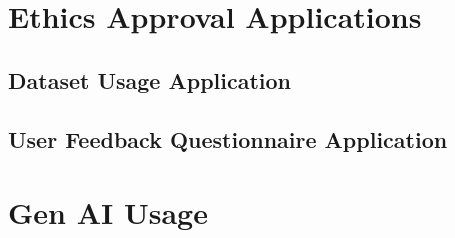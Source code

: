 \chapter{Ethics Approval Applications}
\section{Dataset Usage Application}
\label{app:dataset_application}


\section{User Feedback Questionnaire Application}
\label{app:questionnaire_application}



\chapter{Gen AI Usage}
\label{app:genAI}


